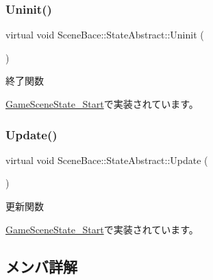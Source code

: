 \subsubsection{\texorpdfstring{Uninit()}{Uninit()}}
{\footnotesize\ttfamily virtual void Scene\+Bace\+::\+State\+Abstract\+::\+Uninit (\begin{DoxyParamCaption}{ }\end{DoxyParamCaption})\hspace{0.3cm}{\ttfamily [pure virtual]}}



終了関数 



\mbox{\hyperlink{class_game_scene_state___start_a636df8b7ac0173b044b0efc2927fb83b}{Game\+Scene\+State\+\_\+\+Start}}で実装されています。

\mbox{\label{class_scene_bace_1_1_state_abstract_a949637cf8453ddd6a8e38fdbd6e4006e}} 
\subsubsection{\texorpdfstring{Update()}{Update()}}
{\footnotesize\ttfamily virtual void Scene\+Bace\+::\+State\+Abstract\+::\+Update (\begin{DoxyParamCaption}{ }\end{DoxyParamCaption})\hspace{0.3cm}{\ttfamily [pure virtual]}}



更新関数 



\mbox{\hyperlink{class_game_scene_state___start_ae11bb8d8ea9eae4fea2a9acf33dd1c8b}{Game\+Scene\+State\+\_\+\+Start}}で実装されています。



\subsection{メンバ詳解}
\mbox{\label{class_scene_bace_1_1_state_abstract_a881f0c962327486fce549fc35549bfa8}} 
